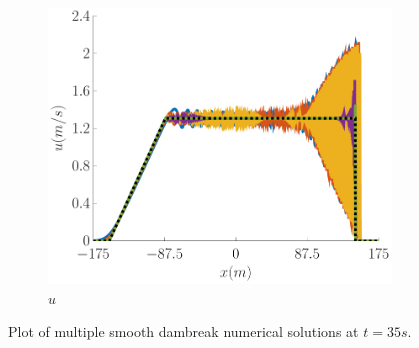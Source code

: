 \documentclass[10pt]{article}
\begin{document}
\begin{figure}
\begin{subfigure}{0.32\textwidth}
	\centering
	\includegraphics[width=\textwidth]{./Figures/Simulations/Study/Serre2SWWECloser/u.pdf}
	\caption{$u$}
	\end{subfigure}
	\caption{Plot of multiple smooth dambreak numerical solutions at $t=35s$.}
\end{figure}
\end{document}
